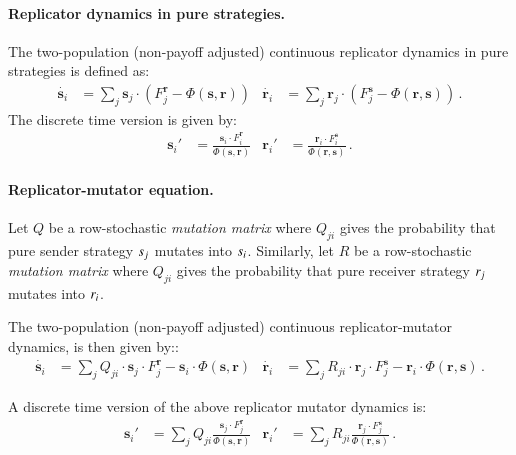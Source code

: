 \documentclass[fleqn,reqno,10pt]{article}
\renewcommand{\Smixed}{\ensuremath{\mathrm{\mathbf{s}}}}
\renewcommand{\Rmixed}{\ensuremath{\mathrm{\mathbf{r}}}}
\begin{document}
\paragraph{Replicator dynamics in pure strategies.} The two-population
(non-payoff adjusted) continuous replicator dynamics in pure
strategies is defined as:
\begin{align*}
  \dot{\Smixed_i} & = \sum_{j} \Smixed_j \cdot \left ( F_j^{\Rmixed} -
  \Phi(\Smixed,\Rmixed) \right ) &   \dot{\Rmixed_i} &  = \sum_{j} \Rmixed_j \cdot \left ( F_j^{\Smixed} -
  \Phi(\Rmixed,\Smixed) \right ) \,.
\end{align*}
The discrete time version is given by: 
\begin{align*}
  \Smixed_i' & = \frac{\Smixed_i \cdot
  F_i^{\Rmixed}}{ \Phi(\Smixed,\Rmixed)} &     \Rmixed_i' & = \frac{\Rmixed_i \cdot
  F_i^{\Smixed}}{ \Phi(\Rmixed,\Smixed)} \,.
\end{align*}


\paragraph{Replicator-mutator equation.} Let $Q$ be a row-stochastic
\emph{mutation matrix} where $Q_{ji}$ gives the probability that pure
sender strategy $s_j$ mutates into $s_i$. Similarly, let $R$
be a row-stochastic \emph{mutation matrix} where $Q_{ji}$ gives the
probability that pure receiver strategy $r_j$ mutates into
$r_i$.

The two-population (non-payoff adjusted) continuous replicator-mutator
dynamics, is then given by::
\begin{align*}
  \dot{\Smixed_i} & = \sum_{j}  Q_{ji} \cdot \Smixed_j
    \cdot F_j^{\Rmixed} - \Smixed_i \cdot \Phi(\Smixed,\Rmixed) &
    \dot{\Rmixed_i} & = \sum_{j}  R_{ji} \cdot \Rmixed_j
    \cdot F_j^{\Smixed} - \Rmixed_i \cdot \Phi(\Rmixed,\Smixed) \,.
\end{align*}
\begin{claim} A discrete time version of the above replicator mutator
  dynamics is:
  \begin{align*}
    \Smixed_i' & = \sum_{j} Q_{ji} \frac{\Smixed_j \cdot
      F_j^{\Rmixed}}{ \Phi(\Smixed,\Rmixed)} & \Rmixed_i' & = \sum_{j}
    R_{ji} \frac{\Rmixed_j \cdot F_j^{\Smixed}}{
      \Phi(\Rmixed,\Smixed)}\,.
  \end{align*}
\end{claim}
\end{document}
